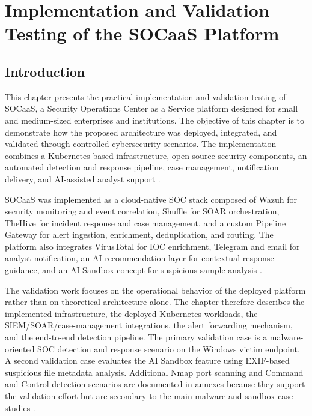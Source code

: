 \setcounter{chapter}{3}
\chapter{Implementation and Validation Testing of the SOCaaS Platform}
\label{chap:socaas-implementation-validation}

\section{Introduction}
\label{sec:ch4-introduction}

This chapter presents the practical implementation and validation testing of SOCaaS, a Security Operations Center as a Service platform designed for small and medium-sized enterprises and institutions. The objective of this chapter is to demonstrate how the proposed architecture was deployed, integrated, and validated through controlled cybersecurity scenarios. The implementation combines a Kubernetes-based infrastructure, open-source security components, an automated detection and response pipeline, case management, notification delivery, and AI-assisted analyst support \cite{ch4-kubernetes-docs,ch4-nist-ai-rmf}.

SOCaaS was implemented as a cloud-native SOC stack composed of Wazuh for security monitoring and event correlation, Shuffle for SOAR orchestration, TheHive for incident response and case management, and a custom Pipeline Gateway for alert ingestion, enrichment, deduplication, and routing. The platform also integrates VirusTotal for IOC enrichment, Telegram and email for analyst notification, an AI recommendation layer for contextual response guidance, and an AI Sandbox concept for suspicious sample analysis \cite{ch4-virustotal-api,ch4-telegram-bot-api,ch4-nist-malware-guide}.

The validation work focuses on the operational behavior of the deployed platform rather than on theoretical architecture alone. The chapter therefore describes the implemented infrastructure, the deployed Kubernetes workloads, the SIEM/SOAR/case-management integrations, the alert forwarding mechanism, and the end-to-end detection pipeline. The primary validation case is a malware-oriented SOC detection and response scenario on the Windows victim endpoint. A second validation case evaluates the AI Sandbox feature using EXIF-based suspicious file metadata analysis. Additional Nmap port scanning and Command and Control detection scenarios are documented in annexes because they support the validation effort but are secondary to the main malware and sandbox case studies \cite{ch4-nmap-docs,ch4-mitre-attack}.

